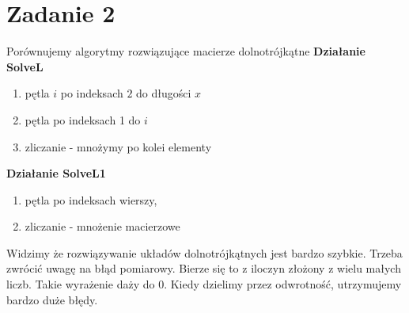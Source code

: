 \section{Zadanie 2}
Porównujemy algorytmy rozwiązujące macierze dolnotrójkątne
\textbf{Działanie SolveL}
\begin{enumerate}
    \item pętla $i$ po indeksach $2$ do długości $x$
    \item pętla po indeksach 1 do $i$
    \item zliczanie - mnożymy po kolei elementy 
\end{enumerate}
\textbf{Działanie SolveL1}
\begin{enumerate}
    \item pętla po indeksach wierszy, 
    \item zliczanie - mnożenie macierzowe 
\end{enumerate}


\begin{center}
\end{center}


\noindent
Widzimy że rozwiązywanie układów dolnotrójkątnych jest bardzo szybkie. Trzeba zwrócić uwagę na błąd pomiarowy. Bierze się to z iloczyn złożony z wielu małych liczb. Takie wyrażenie daży do $0$. Kiedy dzielimy przez odwrotność, utrzymujemy bardzo duże błędy.